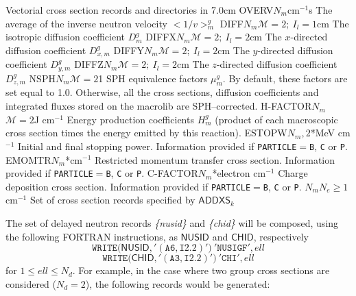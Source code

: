 \begin{DescriptionEnregistrement}{Vectorial cross section records and directories in
}{7.0cm}
\RealEnr
  {OVERV}{$N_{m}$}{cm$^{-1}$s}  
  {The average of the inverse neutron velocity \hbox{$<1/v>_{m}^g$}}
\OptRealEnr
  {DIFF}{$N_{m}$}{$\mathcal{M}=2; \ I_{l}=1$}{cm}  
  {The isotropic diffusion coefficient
   $D_{m}^{g}$}
\OptRealEnr
  {DIFFX}{$N_{m}$}{$\mathcal{M}=2; \ I_{l}=2$}{cm}  
  {The $x$-directed diffusion coefficient
   $D_{x,m}^{g}$}
\OptRealEnr
  {DIFFY}{$N_{m}$}{$\mathcal{M}=2; \ I_{l}=2$}{cm}  
  {The $y$-directed diffusion coefficient
   $D_{y,m}^{g}$}
\OptRealEnr
  {DIFFZ}{$N_{m}$}{$\mathcal{M}=2; \ I_{l}=2$}{cm}  
  {The $z$-directed diffusion coefficient
   $D_{z,m}^{g}$}
\OptRealEnr
  {NSPH}{$N_{m}$}{$\mathcal{M}=2$}{1}  
  {SPH equivalence factors $\mu_{m}^{g}$. By default, these factors are set equal to 1.0.
  Otherwise, all the cross sections, diffusion coefficients and integrated fluxes stored on the {\sc
  macrolib} are SPH--corrected.}
\OptRealEnr
  {H-FACTOR}{$N_{m}$}{$\mathcal{M}=2$}{J cm$^{-1}$}  
  {Energy production coefficients $H_{m}^{g}$ (product of each macroscopic cross section
  times the energy emitted by this reaction).}
\OptRealEnr
  {ESTOPW}{$N_{m},2$}{*}{MeV cm$^{-1}$}  
  {Initial and final stopping power. Information provided if {\tt PARTICLE}$=${\tt B}, {\tt C} or {\tt P}.}
\OptRealEnr
  {EMOMTR}{$N_{m}$}{*}{cm$^{-1}$}  
  {Restricted momentum transfer cross section. Information provided if {\tt PARTICLE}$=${\tt B}, {\tt C} or {\tt P}.}
\OptRealEnr
  {C-FACTOR}{$N_{m}$}{*}{electron cm$^{-1}$}  
  {Charge deposition cross section. Information provided if {\tt PARTICLE}$=${\tt B}, {\tt C} or {\tt P}.}
\OptRealVar
  {}{$N_{m}$}{$N_{e}\ge 1$}{cm$^{-1}$}
  {Set of cross section records specified by $\mathsf{ADDXS}_{k}$}
\end{DescriptionEnregistrement}

The set of delayed neutron records {\sl \{nusid\}} and {\sl \{chid\}} will be
composed, using the following FORTRAN instructions, as $\mathsf{NUSID}$ and $\mathsf{CHID}$,
respectively
  \begin{displaymath}
    \mathtt{WRITE(}\mathsf{NUSID}\mathtt{,'(A6,I2.2)')} \ \mathtt{'NUSIGF'},ell
  \end{displaymath}
  \begin{displaymath}
    \mathtt{WRITE(}\mathsf{CHID}\mathtt{,'(A3,I2.2)')} \ \mathtt{'CHI'},ell
  \end{displaymath}
for $1\leq ell \leq N_d$. For example, in the case where two group cross sections are considered
($N_d=2$), the following records would be generated:

